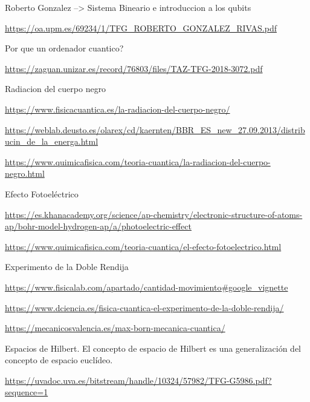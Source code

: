 \documentclass{article}
\numberwithin{equation}{section} %
\begin{document}
        Roberto Gonzalez --> Sistema Bineario e introduccion a los qubits\par
        \url{https://oa.upm.es/69234/1/TFG_ROBERTO_GONZALEZ_RIVAS.pdf}
        \vspace{2mm}

        Por que un ordenador cuantico?\par
        \url{https://zaguan.unizar.es/record/76803/files/TAZ-TFG-2018-3072.pdf}
        \vspace{2mm}

        Radiacion del cuerpo negro\par
        \url{https://www.fisicacuantica.es/la-radiacion-del-cuerpo-negro/}
        \vspace{2mm}

        \url{https://weblab.deusto.es/olarex/cd/kaernten/BBR_ES_new_27.09.2013/distribucin_de_la_energa.html}
        \vspace{2mm}

        \url{https://www.quimicafisica.com/teoria-cuantica/la-radiacion-del-cuerpo-negro.html}
        \vspace{2mm}

        Efecto Fotoeléctrico\par
        \url{https://es.khanacademy.org/science/ap-chemistry/electronic-structure-of-atoms-ap/bohr-model-hydrogen-ap/a/photoelectric-effect}
        \vspace{2mm}

        \url{https://www.quimicafisica.com/teoria-cuantica/el-efecto-fotoelectrico.html}
        \vspace{2mm}

        Experimento de la Doble Rendija\par
        \url{https://www.fisicalab.com/apartado/cantidad-movimiento#google_vignette}
        \vspace{2mm}

        \url{https://www.dciencia.es/fisica-cuantica-el-experimento-de-la-doble-rendija/}
        \vspace{2mm}

        \url{https://mecanicosvalencia.es/max-born-mecanica-cuantica/}
        \vspace{2mm}

        Espacios de Hilbert. El concepto de espacio de Hilbert es una generalización del concepto de espacio euclídeo.\par
        \url{https://uvadoc.uva.es/bitstream/handle/10324/57982/TFG-G5986.pdf?sequence=1}
        \vspace{2mm}
\end{document}
